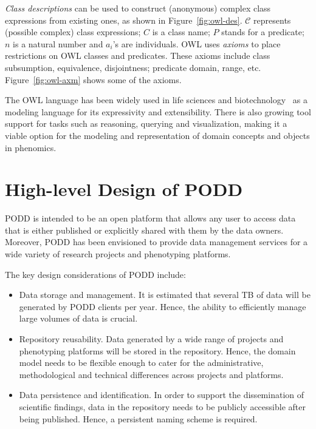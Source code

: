 \documentclass{llncs}
\begin{document}
\vspace{-12pt}
\emph{Class descriptions} can be used to construct (anonymous)
complex class expressions from existing ones, as shown in
Figure~\ref{fig:owl-des}. $\mathcal{C}$ represents (possible
complex) class expressions; $C$ is a class name; $P$ stands for a
predicate; $n$ is a natural number and $a_i$'s are individuals.
OWL uses \emph{axioms} to place restrictions on OWL classes and
predicates. These axioms include class subsumption, equivalence,
disjointness; predicate domain, range, etc. Figure~\ref{fig:owl-axm}
shows some of the axioms.

The OWL language has been widely used in life sciences and
biotechnology~\cite{journals/bib/RuttenbergRSM09,citeulike:1882392,citeulike:212874}
as a modeling language for its expressivity and extensibility. There
is also growing tool support for tasks such as reasoning, querying
and visualization, making it a viable option for the modeling and
representation of domain concepts and objects in phenomics.

\section{High-level Design of PODD}\label{sec:design}
PODD is intended to be an open platform that allows any user to
access data that is either published or explicitly shared with them
by the data owners. Moreover, PODD has been envisioned to provide
data management services for a wide variety of research projects and
phenotyping platforms.

The key design considerations of PODD include:
\begin{itemize}
\item Data storage and management. It is estimated that several TB
of data will be generated by PODD clients per year. Hence, the
ability to efficiently manage large volumes of data is crucial.

\item Repository reusability. Data generated by a wide range of
projects and phenotyping platforms will be stored in the repository.
Hence, the domain model needs to be flexible enough to cater for the
administrative, methodological and technical differences across
projects and platforms.

\item Data persistence and identification. In order to support the
dissemination of scientific findings, data in the repository needs
to be publicly accessible after being published. Hence, a persistent
naming scheme is required.
\end{itemize}
\end{document}
